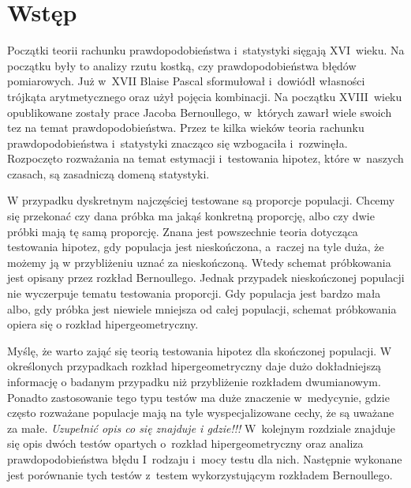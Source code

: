 \chapter*{Wstęp}
Początki teorii rachunku prawdopodobieństwa i~statystyki sięgają XVI~wieku. Na początku były to analizy rzutu kostką, czy prawdopodobieństwa błędów pomiarowych. Już w~XVII Blaise Pascal sformułował i~dowiódł własności trójkąta arytmetycznego oraz użył pojęcia kombinacji. Na początku XVIII~wieku opublikowane zostały prace Jacoba Bernoullego, w~których zawarł wiele swoich tez na temat prawdopodobieństwa. Przez te kilka wieków teoria rachunku prawdopodobieństwa i~statystyki znacząco się wzbogaciła i~rozwinęła. Rozpoczęto rozważania na temat estymacji i~testowania hipotez, które w~naszych czasach, są zasadniczą domeną statystyki.

W przypadku dyskretnym najczęściej testowane są proporcje populacji. Chcemy się przekonać czy dana próbka ma jakąś konkretną proporcję, albo czy dwie próbki mają tę samą proporcję. Znana jest powszechnie teoria dotycząca testowania hipotez, gdy populacja jest nieskończona, a~raczej na tyle duża, że możemy ją w przybliżeniu uznać za nieskończoną. Wtedy schemat próbkowania jest opisany przez rozkład Bernoullego. Jednak przypadek nieskończonej populacji nie wyczerpuje tematu testowania proporcji. Gdy populacja jest bardzo mała albo, gdy próbka jest niewiele mniejsza od całej populacji, schemat próbkowania opiera się o rozkład hipergeometryczny. 

Myślę, że warto zająć się teorią testowania hipotez dla skończonej populacji. W określonych przypadkach rozkład hipergeometryczny daje dużo dokładniejszą informację o badanym przypadku niż przybliżenie rozkładem dwumianowym. Ponadto zastosowanie tego typu testów ma duże znaczenie w~medycynie, gdzie często rozważane populacje mają na tyle wyspecjalizowane cechy, że są uważane za małe. \textit{Uzupełnić opis co się znajduje i gdzie!!!} W~kolejnym rozdziale znajduje się opis dwóch testów opartych o~rozkład hipergeometryczny oraz analiza prawdopodobieństwa błędu I~rodzaju i~mocy testu dla nich. Następnie wykonane jest porównanie tych testów z~testem wykorzystującym rozkładem Bernoullego.